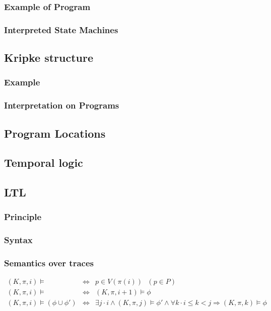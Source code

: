 \documentclass[12pt, a4paper]{book}
\begin{document}
  \subsubsection{Example of Program}
  \label{subs:Example of Program}
  \subsubsection{Interpreted State Machines}
  \label{subs:Interpreted State Machines}
  \subsection{Kripke structure}
  \label{sub:Kripke structure}
  \subsubsection{Example}
  \label{subs:Example}
  \subsubsection{Interpretation on Programs}
  \label{subs:Interpretation on Programs}
  \subsection{Program Locations}
  \label{sub:Program Locations}
  \subsection{Temporal logic}
  \label{sub:Temporal logic}
  \subsection{LTL}
  \label{sub:LTL}
  \subsubsection{Principle}
  \label{subs:Principle}
  \subsubsection{Syntax}
  \label{subs:Syntax}
  \subsubsection{Semantics over traces}
  \label{subs:Semantics over traces}

  \begin{eqnarray*}
      (K, \pi, i) \vDash & \iff & p \in V(\pi(i))\ \ \ (p\in P) \\
      (K, \pi, i) \vDash & \iff & (K,\pi , i+1) \vDash \phi \\
      (K, \pi, i) \vDash (\phi \cup \phi') & \iff & \exists j \cdot i \land (K, \pi, j) \vDash \phi' \land \forall k \cdot i \le k < j \Rightarrow (K, \pi, k) \vDash \phi
  \end{eqnarray*}
\end{document}
